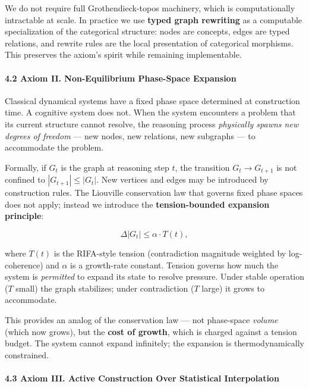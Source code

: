 \documentclass[
  11pt,
  a4paper,
]{article}
\begin{document}
We do not require full Grothendieck-topos machinery, which is
computationally intractable at scale. In practice we use \textbf{typed
graph rewriting} as a computable specialization of the categorical
structure: nodes are concepts, edges are typed relations, and rewrite
rules are the local presentation of categorical morphisms. This
preserves the axiom's spirit while remaining implementable.

\paragraph{4.2 Axiom II. Non-Equilibrium Phase-Space
Expansion}\label{axiom-ii.-non-equilibrium-phase-space-expansion}

Classical dynamical systems have a fixed phase space determined at
construction time. A cognitive system does not. When the system
encounters a problem that its current structure cannot resolve, the
reasoning process \emph{physically spawns new degrees of freedom} ---
new nodes, new relations, new subgraphs --- to accommodate the problem.

Formally, if \(G_t\) is the graph at reasoning step \(t\), the
transition \(G_t \to G_{t+1}\) is not confined to
\(|G_{t+1}| \leq |G_t|\). New vertices and edges may be introduced by
construction rules. The Liouville conservation law that governs fixed
phase spaces does not apply; instead we introduce the
\textbf{tension-bounded expansion principle}:

\[
\Delta|G_t| \leq \alpha \cdot T(t),
\]

where \(T(t)\) is the RIFA-style tension (contradiction magnitude
weighted by log-coherence) and \(\alpha\) is a growth-rate constant.
Tension governs how much the system is \emph{permitted} to expand its
state to resolve pressure. Under stable operation (\(T\) small) the
graph stabilizes; under contradiction (\(T\) large) it grows to
accommodate.

This provides an analog of the conservation law --- not phase-space
\emph{volume} (which now grows), but the \textbf{cost of growth}, which
is charged against a tension budget. The system cannot expand
infinitely; the expansion is thermodynamically constrained.

\paragraph{4.3 Axiom III. Active Construction Over Statistical
Interpolation}\label{axiom-iii.-active-construction-over-statistical-interpolation}
\end{document}
